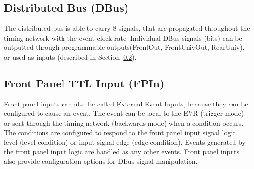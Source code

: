 \documentclass[12pt,a4paper]{article}
\begin{document}
\subsection{Distributed Bus (DBus)}\label{sec:DBus}
The distributed bus is able to carry 8 signals, that are propagated throughout the timing network with the event clock rate. Individual DBus signals (bits) can be outputted through programmable outputs(FrontOut, FrontUnivOut, RearUniv), or used as inputs (described in Section~\ref{sec:Front Panel TTL Input}).


\subsection{Front Panel TTL Input (FPIn)}\label{sec:Front Panel TTL Input}
Front panel inputs can also be called External Event Inputs, because they can be configured to cause an event. The event can be local to the EVR (trigger mode) or sent through the timing network (backwards mode) when a condition occurs. The conditions are configured to respond to the front panel input signal logic level (level condition) or input signal edge (edge condition). Events generated by the front panel input logic are handled as any other events. Front panel inputs also provide configuration options for DBus signal manipulation.
\end{document}
